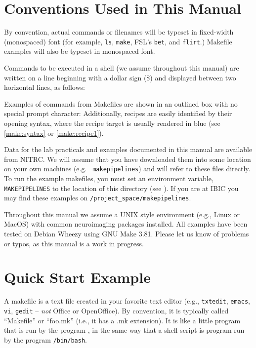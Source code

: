 \section{Conventions Used in This Manual}
	
By convention, actual commands or filenames will be typeset in fixed-width (monospaced) font (for example, \texttt{ls}, \texttt{make}, FSL's \texttt{bet}, and \texttt{flirt}.) Makefile examples will also be typeset in monospaced font.
	
Commands to be executed in a shell (we assume \bashn{} throughout this manual) are written on a line beginning with a dollar sign (\$) and displayed between two horizontal lines, as follows:	
	
Examples of commands from Makefiles are shown in an outlined box with no special prompt character:
Additionally, recipes are easily identified by their opening syntax, where the recipe target is usually rendered in blue (see \autoref{make:syntax} or \autoref{make:recipe1}).	
	
Data for the lab practicals and examples documented in this manual are available from NITRC. We will assume that you have downloaded them into some location on your own machines (e.g. \texttt{~makepipelines}) and will refer to these files directly. To run the example makefiles, you must set an environment variable, \texttt{MAKEPIPELINES} to the location of this directory (see ). If you are at IBIC you may find these examples on \texttt{/project_space/makepipelines}.%

Throughout this manual we assume a UNIX style environment (e.g., Linux or MacOS) with common neuroimaging packages installed. All examples have been tested on Debian Wheezy using GNU Make 3.81. Please let us know of problems or typos, as this manual is a work in progress.
	
\section{Quick Start Example}
	
A makefile is a text file created in your favorite text editor (e.g., \texttt{txtedit}, \texttt{emacs}, \texttt{vi}, \texttt{gedit} -- \emph{not} Office or OpenOffice). By convention, it is typically called ``Makefile'' or ``foo.mk'' (i.e., it has a .mk extension). It is like a little program that is run by the program \maken{}, in the same way that a shell script is program run by the program \texttt{/bin/bash}.
	
